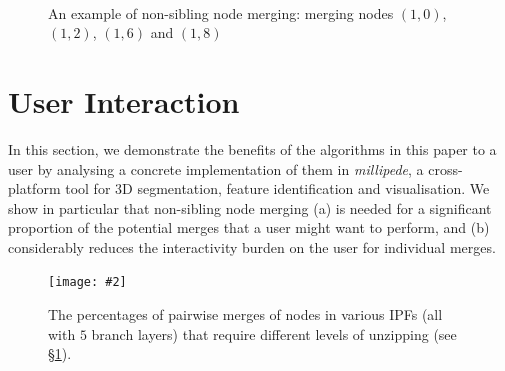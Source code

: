 \documentclass[10pt,twocolumn,twoside]{IEEEtran}
\newcommand{\stufigexx}[5]				%
{
	\begin{figure}[#5]
	\begin{center}
		\texttt{[image: \#2]}
		\caption{#3}
		\label{#4}
	\end{center}
	\end{figure}
}
\newenvironment{stusubfig}[1]
{
	\begin{figure}[#1]
	\begin{center}
}
{
	\end{center}
	\end{figure}
}
\begin{document}
\begin{stusubfig}{p}
	\\
\caption{An example of non-sibling node merging: merging nodes $(1,0)$, $(1,2)$, $(1,6)$ and $(1,8)$}
\label{fig:ipfs-forest-nonsiblingnodemerging}
\end{stusubfig}

\section{User Interaction}
\label{sec:ui}

In this section, we demonstrate the benefits of the algorithms in this paper to a user by analysing a concrete implementation of them in \emph{millipede}, a cross-platform tool for 3D segmentation, feature identification and visualisation. We show in particular that non-sibling node merging (a) is needed for a significant proportion of the potential merges that a user might want to perform, and (b) considerably reduces the interactivity burden on the user for individual merges.

\stufigexx{width=.6\linewidth}{pairwisenodemerges.png}{The percentages of pairwise merges of nodes in various IPFs (all with $5$ branch layers) that require different levels of unzipping (see \S\ref{sec:ui}).}{fig:pairwisenodemerges}{p}
\end{document}
